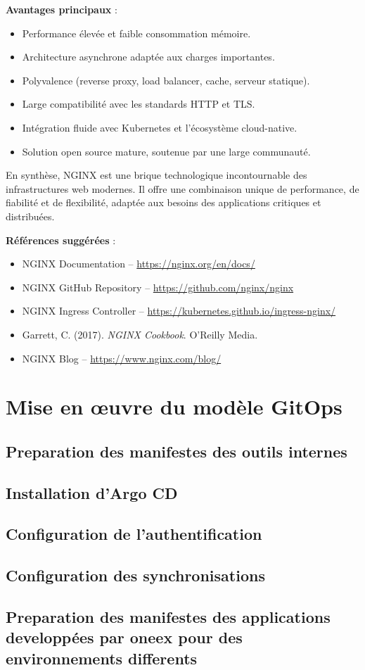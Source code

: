 \textbf{Avantages principaux} :
\begin{itemize}
	\item Performance élevée et faible consommation mémoire.
	\item Architecture asynchrone adaptée aux charges importantes.
	\item Polyvalence (reverse proxy, load balancer, cache, serveur statique).
	\item Large compatibilité avec les standards HTTP et TLS.
	\item Intégration fluide avec Kubernetes et l’écosystème cloud-native.
	\item Solution open source mature, soutenue par une large communauté.
\end{itemize}

En synthèse, NGINX est une brique technologique incontournable des infrastructures web modernes. Il offre une combinaison unique de performance, de fiabilité et de flexibilité, adaptée aux besoins des applications critiques et distribuées.

\textbf{Références suggérées} :
\begin{itemize}
	\item NGINX Documentation – \url{https://nginx.org/en/docs/}
	\item NGINX GitHub Repository – \url{https://github.com/nginx/nginx}
	\item NGINX Ingress Controller – \url{https://kubernetes.github.io/ingress-nginx/}
	\item Garrett, C. (2017). \textit{NGINX Cookbook}. O’Reilly Media.
	\item NGINX Blog – \url{https://www.nginx.com/blog/}
\end{itemize}

\section{Mise en œuvre du modèle GitOps}
\subsection{Preparation des manifestes des outils internes}
\subsection{Installation d'Argo CD}
\subsection{Configuration de l'authentification}
\subsection{Configuration des synchronisations}
\subsection{Preparation des manifestes des applications developpées par oneex pour des environnements differents}